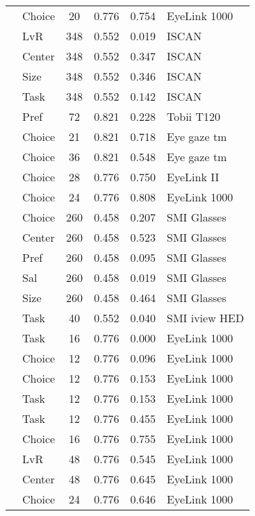 \begin{longtable}{p{8cm}lcccl}
  \cite{cavanagh2014} & Choice & 20 & 0.776 & 0.754 & EyeLink 1000 \\ 
  \cite{chandon2009a} & LvR & 348 & 0.552 & 0.019 & ISCAN \\ 
  \cite{chandon2009a} & Center & 348 & 0.552 & 0.347 & ISCAN \\ 
  \cite{chandon2009a} & Size & 348 & 0.552 & 0.346 & ISCAN \\ 
  \cite{chandon2009a} & Task & 348 & 0.552 & 0.142 & ISCAN \\ 
  \cite{du2014} & Pref & 72 & 0.821 & 0.228 & Tobii T120 \\ 
  \cite{fiedler2012} & Choice & 21 & 0.821 & 0.718 & Eye gaze tm \\ 
  \cite{fiedler2012} & Choice & 36 & 0.821 & 0.548 & Eye gaze tm \\ 
  \cite{folke2016} & Choice & 28 & 0.776 & 0.750 & EyeLink II \\ 
  \cite{folke2016} & Choice & 24 & 0.776 & 0.808 & EyeLink 1000 \\ 
  \cite{gidloef2017a} & Choice & 260 & 0.458 & 0.207 & SMI Glasses \\ 
  \cite{gidloef2017a} & Center & 260 & 0.458 & 0.523 & SMI Glasses \\ 
  \cite{gidloef2017a} & Pref & 260 & 0.458 & 0.095 & SMI Glasses \\ 
  \cite{gidloef2017a} & Sal & 260 & 0.458 & 0.019 & SMI Glasses \\ 
  \cite{gidloef2017a} & Size & 260 & 0.458 & 0.464 & SMI Glasses \\ 
  \cite{gidlof2013} & Task & 40 & 0.552 & 0.040 & SMI iview HED \\ 
  \cite{glaholt2009a} & Task & 16 & 0.776 & 0.000 & EyeLink 1000 \\ 
  \cite{glaholt2009b} & Choice & 12 & 0.776 & 0.096 & EyeLink 1000 \\ 
  \cite{glaholt2009b} & Choice & 12 & 0.776 & 0.153 & EyeLink 1000 \\ 
  \cite{glaholt2009b} & Task & 12 & 0.776 & 0.153 & EyeLink 1000 \\ 
  \cite{glaholt2009b} & Task & 12 & 0.776 & 0.455 & EyeLink 1000 \\ 
  \cite{glaholt2009c} & Choice & 16 & 0.776 & 0.755 & EyeLink 1000 \\ 
  \cite{glaholt2010} & LvR & 48 & 0.776 & 0.545 & EyeLink 1000 \\ 
  \cite{glaholt2010} & Center & 48 & 0.776 & 0.645 & EyeLink 1000 \\ 
  \cite{glaholt2012} & Choice & 24 & 0.776 & 0.646 & EyeLink 1000 \\ 

\end{longtable}
